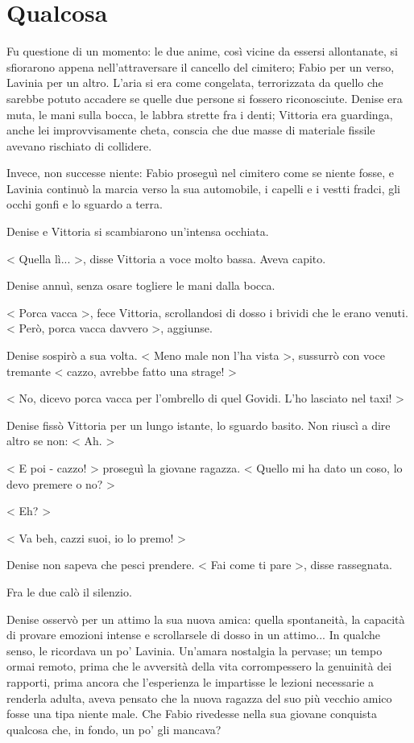 \chapter{Qualcosa}

Fu questione di un momento: le due anime, così vicine da essersi allontanate, si sfiorarono appena nell'attraversare il cancello del cimitero; Fabio per un verso, Lavinia per un altro. L'aria si era come congelata, terrorizzata da quello che sarebbe potuto accadere se quelle due persone si fossero riconosciute. Denise era muta, le mani sulla bocca, le labbra strette fra i denti; Vittoria era guardinga, anche lei improvvisamente cheta, conscia che due masse di materiale fissile avevano rischiato di collidere.

Invece, non successe niente: Fabio proseguì nel cimitero come se niente fosse, e Lavinia continuò la marcia verso la sua automobile, i capelli e i vestti fradci, gli occhi gonfi e lo sguardo a terra.

Denise e Vittoria si scambiarono un'intensa occhiata.

< Quella lì... >, disse Vittoria a voce molto bassa. Aveva capito.

Denise annuì, senza osare togliere le mani dalla bocca.

< Porca vacca >, fece Vittoria, scrollandosi di dosso i brividi che le erano venuti. < Però, porca vacca davvero >, aggiunse.

Denise sospirò a sua volta. < Meno male non l'ha vista >, sussurrò con voce tremante < cazzo, avrebbe fatto una strage! >

< No, dicevo porca vacca per l'ombrello di quel Govidi. L'ho lasciato nel taxi! >

Denise fissò Vittoria per un lungo istante, lo sguardo basito. Non riuscì a dire altro se non: < Ah. >

< E poi - cazzo! > proseguì la giovane ragazza. < Quello mi ha dato un coso, lo devo premere o no? > 

< Eh? >

< Va beh, cazzi suoi, io lo premo! > 

Denise non sapeva che pesci prendere. < Fai come ti pare >, disse rassegnata.

Fra le due calò il silenzio.

Denise osservò per un attimo la sua nuova amica: quella spontaneità, la capacità di provare emozioni intense e scrollarsele di dosso in un attimo... In qualche senso, le ricordava un po' Lavinia. Un'amara nostalgia la pervase; un tempo ormai remoto, prima che le avversità della vita corrompessero la genuinità dei rapporti, prima ancora che l'esperienza le impartisse le lezioni necessarie a renderla adulta, aveva pensato che la nuova ragazza del suo più vecchio amico fosse una tipa niente male. Che Fabio rivedesse nella sua giovane conquista qualcosa che, in fondo, un po' gli mancava?


